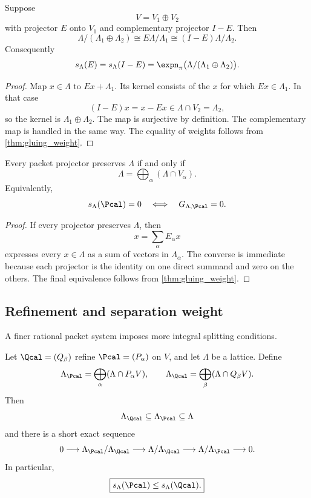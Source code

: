 \begin{corollary}\label{cor:binary_gluing}
Suppose
\[
V=V_1\oplus V_2
\]
with projector $E$ onto $V_1$ and complementary projector $I-E$.  Then
\[
\Lambda/(\Lambda_1\oplus\Lambda_2)
\cong
E\Lambda/\Lambda_1
\cong
(I-E)\Lambda/\Lambda_2.
\]
Consequently
\[
s_\Lambda(E)=s_\Lambda(I-E)
=
\expn_\pi\bigl(\Lambda/(\Lambda_1\oplus\Lambda_2)\bigr).
\]
\end{corollary}

\begin{proof}
Map $x\in\Lambda$ to $Ex+\Lambda_1$.  Its kernel consists of the $x$ for which $Ex\in\Lambda_1$.  In that case
\[
(I-E)x=x-Ex\in\Lambda\cap V_2=\Lambda_2,
\]
so the kernel is $\Lambda_1\oplus\Lambda_2$.  The map is surjective by definition.  The complementary map is handled in the same way.  The equality of weights follows from \cref{thm:gluing_weight}.
\end{proof}

\begin{corollary}\label{cor:integral_split}
Every packet projector preserves $\Lambda$ if and only if
\[
\Lambda=\bigoplus_\alpha(\Lambda\cap V_\alpha).
\]
Equivalently,
\[
s_\Lambda(\Pcal)=0
\quad\Longleftrightarrow\quad
G_{\Lambda,\Pcal}=0.
\]
\end{corollary}

\begin{proof}
If every projector preserves $\Lambda$, then
\[
x=\sum_\alpha E_\alpha x
\]
expresses every $x\in\Lambda$ as a sum of vectors in $\Lambda_\alpha$.  The converse is immediate because each projector is the identity on one direct summand and zero on the others.  The final equivalence follows from \cref{thm:gluing_weight}.
\end{proof}

\subsection{Refinement and separation weight}

A finer rational packet system imposes more integral splitting conditions.

\begin{theorem}\label{thm:gluing_refinement}
Let $\Qcal=(Q_\beta)$ refine $\Pcal=(P_\alpha)$ on $V$, and let $\Lambda$ be a lattice.  Define
\[
\Lambda_{\Pcal}
=
\bigoplus_\alpha(\Lambda\cap P_\alpha V),
\qquad
\Lambda_{\Qcal}
=
\bigoplus_\beta(\Lambda\cap Q_\beta V).
\]
Then
\[
\Lambda_{\Qcal}\subseteq\Lambda_{\Pcal}\subseteq\Lambda
\]
and there is a short exact sequence
\[
0
\longrightarrow
\Lambda_{\Pcal}/\Lambda_{\Qcal}
\longrightarrow
\Lambda/\Lambda_{\Qcal}
\longrightarrow
\Lambda/\Lambda_{\Pcal}
\longrightarrow0.
\]
In particular,
\[
\boxed{
s_\Lambda(\Pcal)\leq s_\Lambda(\Qcal).
}
\]
\end{theorem}

